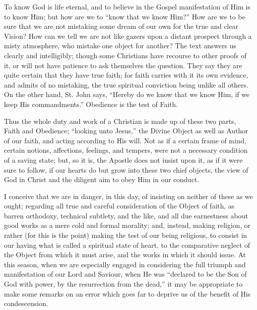 To know God is life eternal, and to believe in the Gospel
manifestation of Him is to know Him; but how are we to ``know that
we know Him?'' How are we to be sure that we are not mistaking some
dream of our own for the true and clear Vision? How can we tell we are
not like gazers upon a distant prospect through a misty atmosphere, who
mistake one object for another? The text answers us clearly and
intelligibly; though some Christians have recourse to other proofs of
it, or will not have patience to ask themselves the question. They say
they are quite certain that they have true faith; for faith carries with
it its own evidence, and admits of no mistaking, the true spiritual
conviction being unlike all others. On the other hand, St. John says,
``Hereby do we know that we know Him, if we keep His
commandments.'' Obedience is the test of Faith.

Thus the whole duty and work of a Christian is made up of these two
parts, Faith and Obedience; ``looking unto Jesus,'' the Divine
Object as well as Author of our faith, and acting according to His will.
Not as if a certain frame of mind, certain notions, affections,
feelings, and tempers, were not a necessary condition of a saving state;
but, so it is, the Apostle does not insist upon it, as if it were sure
to follow, if our hearts do but grow into these two chief objects, the
view of God in Christ and the diligent aim to obey Him in our conduct.

I conceive that we are in danger, in this day, of insisting on
neither of these as we ought; regarding all true and careful
consideration of the Object of faith, as barren orthodoxy, technical
subtlety, and the like, and all due earnestness about good works as a
mere cold and formal morality; and, instead, making religion, or rather
(for this is the point) making the test of our being religious, to
consist in our having what is called a spiritual state of heart, to the
comparative neglect of the Object from which it must arise, and the
works in which it should issue. At this season, when we are especially
engaged in considering the full triumph and manifestation of our Lord
and Saviour, when He was ``declared to be the Son of God with power,
by the resurrection from the dead,'' it may be appropriate to make
some remarks on an error which goes far to deprive us of the benefit of
His condescension.

